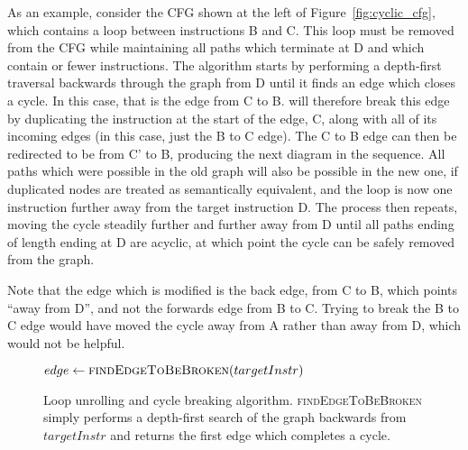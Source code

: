 As an example, consider the CFG shown at the left of
Figure~\ref{fig:cyclic_cfg}, which contains a loop between
instructions B and C.  This loop must be removed from the CFG while
maintaining all paths which terminate at D and which contain
\backref{$\alpha$} or fewer instructions.  The algorithm starts by
performing a depth-first traversal backwards through the graph from D
until it finds an edge which closes a cycle.  In this case, that is
the edge from C to B.  {\Technique} will therefore break this edge by
duplicating the instruction at the start of the edge, C, along with
all of its incoming edges (in this case, just the B to C edge).  The C
to B edge can then be redirected to be from C' to B, producing the
next diagram in the sequence.  All paths which were possible in the
old graph will also be possible in the new one, if duplicated nodes
are treated as semantically equivalent, and the loop is now one
instruction further away from the target instruction D.  The process
then repeats, moving the cycle steadily further and further away from
D until all paths ending of length \backref{$\alpha$} ending at D are
acyclic, at which point the cycle can be safely removed from the
graph.

Note that the edge which is modified is the back edge, from C to B,
which points ``away from D'', and not the forwards edge from B to C.
Trying to break the B to C edge would have moved the cycle away from A
rather than away from D, which would not be helpful.

\begin{figure}
\begin{algorithmic}[1]
     \State $edge \gets \textsc{findEdgeToBeBroken}(targetInstr)$
     \Else
        \EndFor
     \EndIf
  \EndWhile
\end{algorithmic}
\caption{Loop unrolling and cycle breaking algorithm.
  \textsc{findEdgeToBeBroken} simply performs a depth-first search of
  the graph backwards from $targetInstr$ and returns the first edge
  which completes a cycle.}
\label{fig:derive:read:unroll_cycle_break}
\end{figure}

